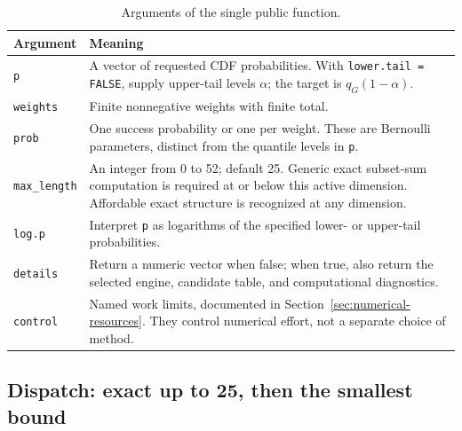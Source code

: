 \documentclass[11pt,letterpaper]{article}
\numberwithin{equation}{section}
\theoremstyle{definition}
\theoremstyle{remark}
\begin{document}
\begin{table}[htbp]
\centering
\caption{Arguments of the single public function.}
\label{tab:arguments}
\begin{tabularx}{\linewidth}{@{}lX@{}}
\toprule
Argument & Meaning \\
\midrule
\texttt{p} & A vector of requested CDF probabilities. With
\texttt{lower.tail = FALSE}, supply upper-tail levels $\alpha$;
the target is $q_G(1-\alpha)$. \\
\texttt{weights} & Finite nonnegative weights with finite total. \\
\texttt{prob} & One success probability or one per weight. These are
Bernoulli parameters, distinct from the quantile levels in \texttt{p}. \\
\texttt{max\_length} & An integer from 0 to 52; default 25. Generic exact
subset-sum computation is required at or below this active dimension.
Affordable exact structure is recognized at any dimension. \\
\texttt{log.p} & Interpret \texttt{p} as logarithms of the specified
lower- or upper-tail probabilities. \\
\texttt{details} & Return a numeric vector when false; when true, also
return the selected engine, candidate table, and computational diagnostics. \\
\texttt{control} & Named work limits, documented in
Section~\ref{sec:numerical-resources}. They control numerical effort,
not a separate choice of method. \\
\bottomrule
\end{tabularx}
\end{table}

\subsection{Dispatch: exact up to 25, then the smallest bound}
\end{document}
